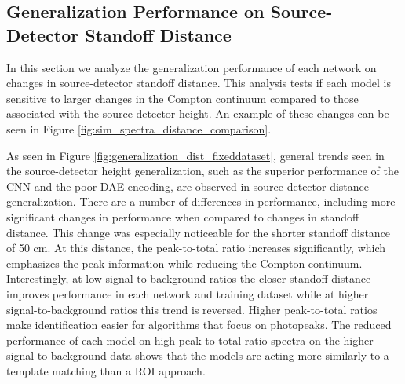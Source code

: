 \subsection{Generalization Performance on Source-Detector Standoff Distance}

In this section we analyze the generalization performance of each network on changes in source-detector standoff distance. This analysis tests if each model is sensitive to larger changes in the Compton continuum compared to those associated with the source-detector height. An example of these changes can be seen in Figure \ref{fig:sim_spectra_distance_comparison}.

As seen in Figure \ref{fig:generalization_dist_fixeddataset}, general trends seen in the source-detector height generalization, such as the superior performance of the CNN and the poor DAE encoding, are observed in source-detector distance generalization. There are a number of differences in performance, including more significant changes in performance when compared to changes in standoff distance. This change was especially noticeable for the shorter standoff distance of 50 cm. At this distance, the peak-to-total ratio increases significantly, which emphasizes the peak information while reducing the Compton continuum. Interestingly, at low signal-to-background ratios the closer standoff distance improves performance in each network and training dataset while at higher signal-to-background ratios this trend is reversed. Higher peak-to-total ratios make identification easier for algorithms that focus on photopeaks. The reduced performance of each model on high peak-to-total ratio spectra on the higher signal-to-background data shows that the models are acting more similarly to a template matching than a ROI approach. 






